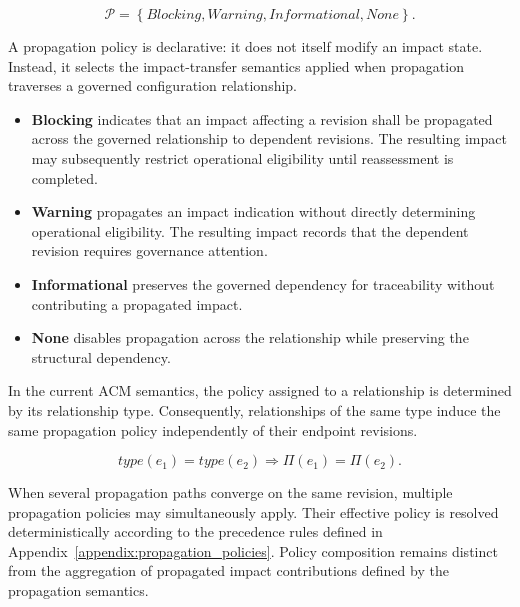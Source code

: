 \documentclass[10pt]{article}
\begin{document}
\begin{equation}
	\mathcal{P}=
	\left\{
	\textit{Blocking},
	\textit{Warning},
	\textit{Informational},
	\textit{None}
	\right\}.
	\label{eq:policy_space}
\end{equation}

A propagation policy is declarative: it does not itself modify an impact state. Instead, it selects the impact-transfer semantics applied when propagation traverses a governed configuration relationship.

\begin{itemize}
	\item \textbf{Blocking} indicates that an impact affecting a revision shall be
	propagated across the governed relationship to dependent revisions. The resulting impact may subsequently restrict operational eligibility until reassessment is completed.
	
	\item \textbf{Warning} propagates an impact indication without directly
	determining operational eligibility. The resulting impact records that the
	dependent revision requires governance attention.
	
	\item \textbf{Informational} preserves the governed dependency for traceability
	without contributing a propagated impact.
	
	\item \textbf{None} disables propagation across the relationship while preserving the structural dependency.
\end{itemize}


In the current ACM semantics, the policy assigned to a relationship is determined by its relationship type. Consequently, relationships of the same type induce the same propagation policy independently of their endpoint revisions.

\begin{equation}
	type(e_1)=type(e_2)
	\Longrightarrow
	\Pi(e_1)=\Pi(e_2).
	\label{eq:policy_type_consistency}
\end{equation}

When several propagation paths converge on the same revision, multiple propagation policies may simultaneously apply. Their effective policy is resolved
deterministically according to the precedence rules defined in Appendix~\ref{appendix:propagation_policies}. Policy composition remains distinct
from the aggregation of propagated impact contributions defined by the propagation semantics.
\end{document}
